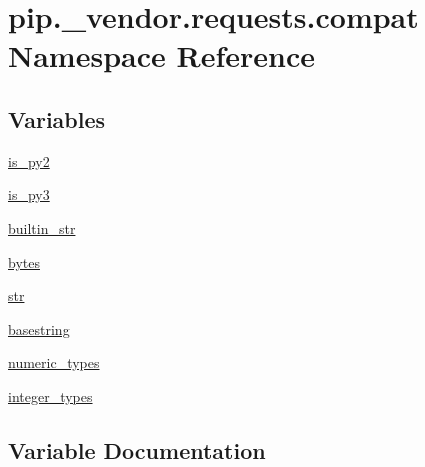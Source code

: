 \hypertarget{namespacepip_1_1__vendor_1_1requests_1_1compat}{}\section{pip.\+\_\+vendor.\+requests.\+compat Namespace Reference}
\label{namespacepip_1_1__vendor_1_1requests_1_1compat}
\subsection*{Variables}
\begin{DoxyCompactItemize}
\item 
\hyperlink{namespacepip_1_1__vendor_1_1requests_1_1compat_a2ed33a149b3fc1c36aa8e9b364621e78}{is\+\_\+py2}
\item 
\hyperlink{namespacepip_1_1__vendor_1_1requests_1_1compat_a3b9a77eaa57bb957a0ca014f686bdb9a}{is\+\_\+py3}
\item 
\hyperlink{namespacepip_1_1__vendor_1_1requests_1_1compat_a960b0950310f7506ae8d8e4aa1c7a3b8}{builtin\+\_\+str}
\item 
\hyperlink{namespacepip_1_1__vendor_1_1requests_1_1compat_acdad6163620499e5156d111c77f6b709}{bytes}
\item 
\hyperlink{namespacepip_1_1__vendor_1_1requests_1_1compat_a0a3891b273b8f1ce270e9356700eb984}{str}
\item 
\hyperlink{namespacepip_1_1__vendor_1_1requests_1_1compat_a7e0f3823d6a8735c297e95ea95387b71}{basestring}
\item 
\hyperlink{namespacepip_1_1__vendor_1_1requests_1_1compat_a7c40953aa5bb230044ab1ffbca47bda0}{numeric\+\_\+types}
\item 
\hyperlink{namespacepip_1_1__vendor_1_1requests_1_1compat_a0ed63ec188f2303fc433a159b985d975}{integer\+\_\+types}
\end{DoxyCompactItemize}


\subsection{Variable Documentation}
\mbox{\label{namespacepip_1_1__vendor_1_1requests_1_1compat_a7e0f3823d6a8735c297e95ea95387b71}} 
